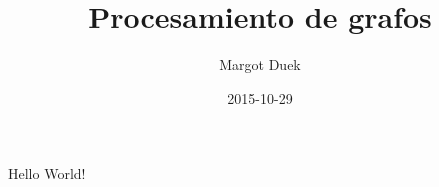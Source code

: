 \documentclass{article}
\title{Procesamiento de grafos}
\date{2015-10-29}
\author{Margot Duek}
\begin{document}
  \maketitle
  \newpage

  Hello World!
\end{document}

